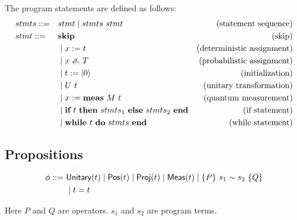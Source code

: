 \newcommand{\rndarrow}{%
  \stackrel{\raisebox{-.25ex}[.25ex]%
   {\tiny $\mathdollar$}}{\raisebox{-.25ex}[.25ex]{$\leftarrow$}}}

\newcommand{\Skip}{\textbf{skip}}
\newcommand{\Assign}[2]{\ensuremath{#1:=#2}}
\newcommand{\pAssign}[2]{\ensuremath{#1 \rndarrow #2}}
\newcommand{\Init}[1]{\ensuremath{#1:=\ket{0}}}
\newcommand{\MeaAssign}[3]{\ensuremath{#1 := \textbf{meas}\ #2\ #3}}
\newcommand{\If}[3]{\ensuremath{
    \textbf{if}\ #1\ \textbf{then}\ #2\ \textbf{else}\ #3\ \textbf{end}
}}
\newcommand{\While}[2]{\ensuremath{
    \textbf{while}\ #1\ \textbf{do}\ #2\ \textbf{end}
}}

\begin{definition}
    \label{def: prog syntax}
    The program statements are defined as follows:
    \begin{align*}
        & stmts ::= && stmt \mid stmts\ stmt & \text{(statement sequence)} \\
        & stmt ::= && \Skip & \text{(skip)} \\
            & && \mid \Assign{x}{t} & \text{(deterministic assignment)} \\
            & && \mid \pAssign{x}{T} & \text{(probabilistic assignment)} \\
            & && \mid \Init{t} & \text{(initialization)} \\
            & && \mid U\ t & \text{(unitary transformation)} \\
            & && \mid \MeaAssign{x}{M}{t} & \text{(quantum measurement)} \\
            & && \mid \If{t}{stmts_1}{stmts_2} & \text{(if statement)} \\
            & && \mid \While{t}{stmts} & \text{(while statement)}
    \end{align*}
\end{definition}

\subsection{Propositions}

\begin{definition}
    \label{def:prop syntax}
    \begin{align*}
        \phi ::=\ & \textsf{Unitary}({t}) \mid \textsf{Pos}({t}) \mid \textsf{Proj}({t}) \mid \textsf{Meas}(t) \mid \{P\}~s_1 \sim s_2~\{Q\} \\
                & \mid t = t
    \end{align*}
\end{definition}
Here $P$ and $Q$ are operators. $s_1$ and $s_2$ are program terms.


